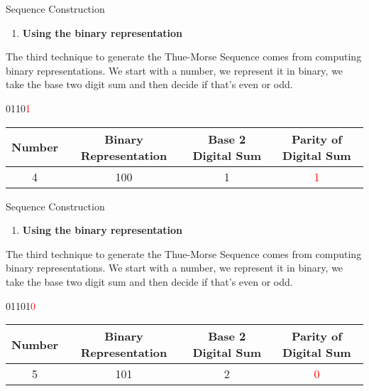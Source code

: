 \documentclass{beamer}
\begin{document}
\begin{frame}{Sequence Construction}
    \scriptsize
    \begin{enumerate}[3]
    \item \textbf{\large Using the binary representation}
    \end{enumerate}
    \begin{center}
        \normalsize The third technique to generate the Thue-Morse Sequence comes from computing binary representations. We start with a number, we represent it in binary, we take the base two digit sum and then decide if that's even or odd.
    \end{center}

    \vfill

    \begin{center} 
        0110\textcolor{red}{1}
    \end{center}

    \vfill

    \begin{center}
    \begin{tabular}{c|c|c|c|}
   
    \textbf{Number} & \textbf{Binary Representation} & \textbf{Base 2 Digital Sum} & \textbf{Parity of Digital Sum} \\ \hline
    4 & 100 & 1 & \textcolor{red}{1}
    \end{tabular}
    \end{center}

\end{frame}

\begin{frame}{Sequence Construction}
    \scriptsize
    \begin{enumerate}[3]
    \item \textbf{\large Using the binary representation}
    \end{enumerate}
    \begin{center}
        \normalsize The third technique to generate the Thue-Morse Sequence comes from computing binary representations. We start with a number, we represent it in binary, we take the base two digit sum and then decide if that's even or odd.
    \end{center}

    \vfill

    \begin{center} 
        01101\textcolor{red}{0}
    \end{center}

    \vfill

    \begin{center}
    \begin{tabular}{c|c|c|c|}
   
    \textbf{Number} & \textbf{Binary Representation} & \textbf{Base 2 Digital Sum} & \textbf{Parity of Digital Sum} \\ \hline
    5 & 101 & 2 & \textcolor{red}{0}
    \end{tabular}
    \end{center}

\end{frame}
\end{document}
